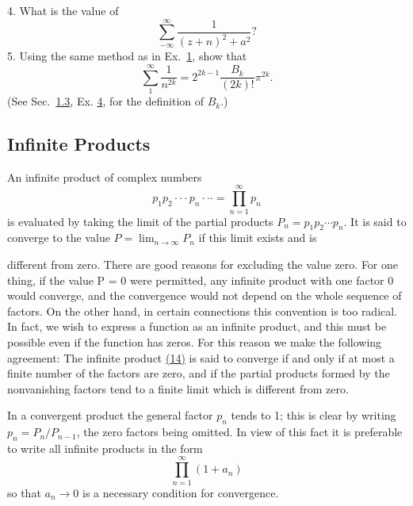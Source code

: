 4. What is the value of
\begin{equation*}
\sum_ {- \infty} ^ {\infty} \frac {1}{(z + n) ^ {2} + a ^ {2}}?
\end{equation*}
5. Using the same method as in Ex.~\hyperref[exercise:5.2.1.4.1]{1}, show that
\begin{equation*}
\sum_ {1} ^ {\infty} \frac {1}{n ^ {2 k}} = 2 ^ {2 k - 1} \frac {B _ {k}}{(2 k) !} \pi^ {2 k}.
\end{equation*}
(See Sec.~\hyperref[sec:5.1.3]{1.3}, Ex. \hyperref[exercise:5.1.3.3.4]{4}, for the definition of $B_{k}$.)


\setcounter{section}{2}\setcounter{subsection}{1}\subsection{Infinite Products}\label{sec:5.2.2}
An infinite product of complex numbers
\begin{equation*}
p _ {1} p _ {2} \cdot \cdot \cdot p _ {n} \cdot \cdot \cdot = \prod_ {n = 1} ^ {\infty} p _ {n}\tag{14}\label{eq:5.14}
\end{equation*}
is evaluated by taking the limit of the partial products $P_{n} = p_{1}p_{2} \cdots p_{n}$. It is said to converge to the value $P = \lim_{n \to \infty} P_{n}$ if this limit exists and is

different from zero. There are good reasons for excluding the value zero. For one thing, if the value P = 0 were permitted, any infinite product with one factor 0 would converge, and the convergence would not depend on the whole sequence of factors. On the other hand, in certain connections this convention is too radical. In fact, we wish to express a function as an infinite product, and this must be possible even if the function has zeros. For this reason we make the following agreement: The infinite product \hyperref[eq:5.14]{(14)} is said to converge if and only if at most a finite number of the factors are zero, and if the partial products formed by the nonvanishing factors tend to a finite limit which is different from zero.

In a convergent product the general factor $p_{n}$ tends to 1; this is clear by writing $p_{n} = P_{n}/P_{n-1}$, the zero factors being omitted. In view of this fact it is preferable to write all infinite products in the form
\begin{equation*}
\prod_ {n = 1} ^ {\infty} (1 + a _ {n})\tag{15}\label{eq:5.15}
\end{equation*}
so that $a_{n} \to 0$ is a necessary condition for convergence.

